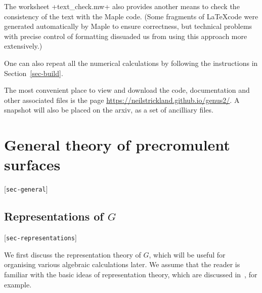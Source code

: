 \documentclass[reqno]{amsart}
\newcommand{\lbl}[1]{\label{#1}\textup{[\texttt{#1}]}\par}
\newcommand{\lbl}{\label}
\renewcommand{\:}{\colon}
\theoremstyle{definition}
\begin{document}
The worksheet \fname+text_check.mw+ also provides another means to check
the consistency of the text with the Maple code.  (Some fragments of
\LaTeX code were generated automatically by Maple to ensure
correctness, but technical problems with precise control of formatting
dissuaded us from using this approach more extensively.)

One can also repeat all the numerical calculations by following the
instructions in Section~\ref{sec-build}.

The most convenient place to view and download the code, documentation
and other associated files is the page
\url{https://neilstrickland.github.io/genus2/}.  A snapshot will also
be placed on the arxiv, as a set of ancilliary files.

\section{General theory of precromulent surfaces}
\lbl{sec-general}

\subsection{Representations of \texorpdfstring{$G$}{G}}
\lbl{sec-representations}

We first discuss the representation theory of $G$, which will be useful
for organising various algebraic calculations later.  We assume that
the reader is familiar with the basic ideas of representation theory,
which are discussed in~\cite{se:lrf}, for example.
\end{document}
